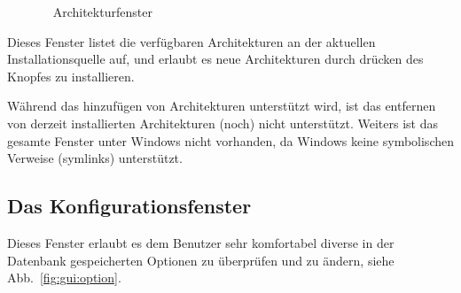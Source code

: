 \begin{figure}[ht!]
  \centering
  \caption{\tlmgr\  Architekturfenster}
  \label{fig:gui:arch}
\end{figure}

Dieses Fenster listet die verfügbaren Architekturen an der aktuellen
Installationsquelle auf, und erlaubt es neue Architekturen durch
drücken des Knopfes  zu installieren.

Während das hinzufügen von Architekturen unterstützt wird, ist das
entfernen von derzeit installierten Architekturen (noch) 
nicht unterstützt. Weiters ist das gesamte Fenster unter Windows
nicht vorhanden, da Windows keine symbolischen Verweise (symlinks)
unterstützt.

\subsection{Das Konfigurationsfenster}

Dieses Fenster erlaubt es dem Benutzer sehr komfortabel diverse 
in der Datenbank gespeicherten Optionen zu überprüfen und zu ändern,
siehe Abb.~\ref{fig:gui:option}.

